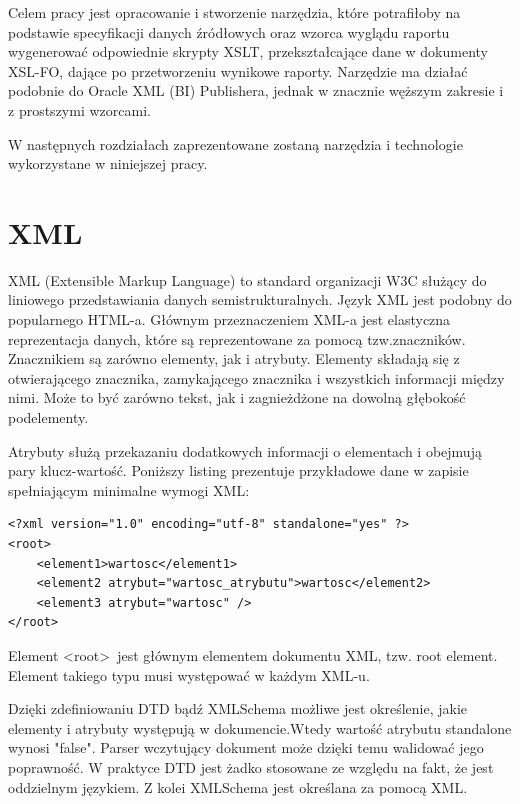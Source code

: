 \documentclass[11pt,a4paper]{article}
\begin{document}
Celem pracy jest opracowanie i stworzenie narzędzia, które potrafiłoby na podstawie specyfikacji danych źródłowych oraz wzorca wyglądu raportu wygenerować odpowiednie skrypty XSLT, przekształcające dane w dokumenty XSL-FO, dające po przetworzeniu wynikowe raporty. Narzędzie ma działać podobnie do Oracle XML (BI) Publishera, jednak w znacznie węższym zakresie i z prostszymi wzorcami.

W następnych rozdziałach zaprezentowane zostaną narzędzia i technologie wykorzystane w niniejszej pracy.

\section{XML} \label{sec:xml}
XML (Extensible Markup Language) to standard organizacji W3C służący do liniowego przedstawiania danych semistrukturalnych. Język XML jest podobny do popularnego HTML-a. Głównym przeznaczeniem XML-a jest elastyczna reprezentacja danych, które są reprezentowane za pomocą tzw.znaczników. Znacznikiem są zarówno elementy, jak i atrybuty. Elementy składają się z otwierającego znacznika, zamykającego znacznika i wszystkich informacji między nimi. Może to być zarówno tekst, jak i zagnieżdżone na dowolną głębokość podelementy. 

Atrybuty służą przekazaniu dodatkowych informacji o elementach i obejmują pary klucz-wartość. Poniższy listing prezentuje przykładowe dane w zapisie spełniającym minimalne wymogi XML:\\

\lstset{language=XML}
\begin{lstlisting}[frame=single,caption=Prosty XML,label=simplexml]
<?xml version="1.0" encoding="utf-8" standalone="yes" ?>
<root>
	<element1>wartosc</element1>
	<element2 atrybut="wartosc_atrybutu">wartosc</element2>
	<element3 atrybut="wartosc" />
</root>
\end{lstlisting}

Element \textless root\textgreater \ jest głównym elementem dokumentu XML, tzw. root element. Element takiego typu musi występować w każdym XML-u.

Dzięki zdefiniowaniu DTD bądź XMLSchema możliwe jest określenie, jakie elementy i atrybuty występują w dokumencie.Wtedy wartość atrybutu standalone wynosi "false".  Parser wczytujący dokument może dzięki temu walidować jego poprawność. W praktyce DTD jest żadko stosowane ze względu na fakt, że jest oddzielnym językiem. Z kolei XMLSchema jest określana za pomocą XML.
\end{document}
